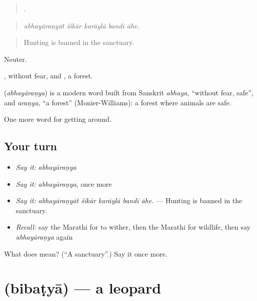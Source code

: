 \begin{quote}
    .
\end{quote}

\begin{quote}
\emph{abhayāraṇyāt śikār karāylā bandī āhe.}
\end{quote}

\begin{quote}
Hunting is banned in the sanctuary.
\end{quote}

Neuter.

, without fear, and , a forest.

\begin{cousinweb}
\textbf{} (\emph{abhayāraṇya}) is a modern word built from Sanskrit \emph{abhaya}, \textquotedblleft{}without fear, safe\textquotedblright{}, and \emph{araṇya}, \textquotedblleft{}a forest\textquotedblright{} (Monier-Williams): a forest where animals are safe.
\end{cousinweb}

\begin{grammarlens}[title={What you've built}]
One more word for getting around.
\end{grammarlens}

\subsection*{Your turn}
\begin{itemize}
\raggedright
  \item \emph{Say it:} \emph{abhayāraṇya}
  \item \emph{Say it:} \emph{abhayāraṇya}, once more
  \item \emph{Say it:} \emph{abhayāraṇyāt śikār karāylā bandī āhe.} — Hunting is banned in the sanctuary.
  \item \emph{Recall:} say the Marathi for to wither, then the Marathi for wildlife, then say \emph{abhayāraṇya} again
\end{itemize}

\begin{tcolorbox}[breakable,colback=teal!4,colframe=teal!35!black,title={Before you move on}]
What does  mean? (\textquotedblleft{}A sanctuary\textquotedblright{}.) Say it once more.
\end{tcolorbox}
\section[\texorpdfstring{\mr{बिबट्या} (bibaṭyā)}{बिबट्या (bibaṭyā)}]{ (bibaṭyā) — a leopard}

